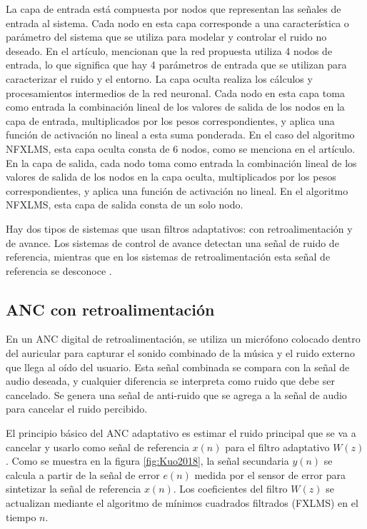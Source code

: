 \documentclass[a4paper,12pt]{article}
\begin{document}
La capa de entrada está compuesta por nodos que representan las señales de entrada al sistema.
Cada nodo en esta capa corresponde a una característica o parámetro del sistema que se utiliza para modelar y controlar el ruido no deseado.
En el artículo, mencionan que la red propuesta utiliza 4 nodos de entrada, lo que significa que hay 4 parámetros de entrada que se utilizan para caracterizar el ruido y el entorno.
La capa oculta realiza los cálculos y procesamientos intermedios de la red neuronal.
Cada nodo en esta capa toma como entrada la combinación lineal de los valores de salida de los nodos en la capa de entrada, multiplicados por los pesos correspondientes, y aplica una función de activación no lineal a esta suma ponderada.
En el caso del algoritmo NFXLMS, esta capa oculta consta de 6 nodos, como se menciona en el artículo.
En la capa de salida, cada nodo toma como entrada la combinación lineal de los valores de salida de los nodos en la capa oculta, multiplicados por los pesos correspondientes, y aplica una función de activación no lineal. En el algoritmo NFXLMS, esta capa de salida consta de un solo nodo.

Hay dos tipos de sistemas que usan filtros adaptativos: con retroalimentación y de avance.
Los sistemas de control de avance detectan una señal de ruido de referencia, mientras que en los sistemas de retroalimentación esta señal de referencia se desconoce \parencite{Salmasi2011}.

\subsection{ANC con retroalimentación}

En un ANC digital de retroalimentación, se utiliza un micrófono colocado dentro del auricular para capturar el sonido combinado de la música y el ruido externo que llega al oído del usuario.
Esta señal combinada se compara con la señal de audio deseada, y cualquier diferencia se interpreta como ruido que debe ser cancelado.
Se genera una señal de anti-ruido que se agrega a la señal de audio para cancelar el ruido percibido.

El principio básico del ANC adaptativo es estimar el ruido principal que se va a cancelar y usarlo como señal de referencia $x(n)$ para el filtro adaptativo $W(z)$. Como se muestra en la figura \ref{fig:Kuo2018}, la señal secundaria $y(n)$ se calcula a partir de la señal de error $e(n)$ medida por el sensor de error para sintetizar la señal de referencia $x(n)$. Los coeficientes del filtro $W(z)$ se actualizan mediante el algoritmo de mínimos cuadrados filtrados (FXLMS) en el tiempo $n$.
\end{document}
